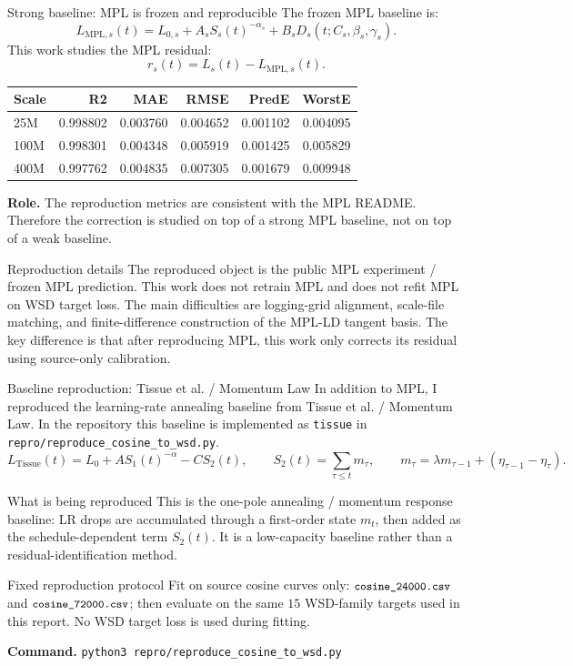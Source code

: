 \documentclass[9pt,aspectratio=169]{beamer}
\newcommand{\code}[1]{\texttt{\small #1}}
\begin{document}
\begin{frame}{Strong baseline: MPL is frozen and reproducible}
\small
The frozen MPL baseline is:
\[
L_{\mathrm{MPL},s}(t)
=
L_{0,s}
+
A_s S_s(t)^{-\alpha_s}
+
B_s D_s(t;C_s,\beta_s,\gamma_s).
\]
This work studies the MPL residual:
\[
r_s(t)=L_s(t)-L_{\mathrm{MPL},s}(t).
\]
\vfill
\begin{center}\scriptsize
\begin{tabular}{lrrrrr}
\toprule
Scale & R2 & MAE & RMSE & PredE & WorstE\\
\midrule
25M  & 0.998802 & 0.003760 & 0.004652 & 0.001102 & 0.004095\\
100M & 0.998301 & 0.004348 & 0.005919 & 0.001425 & 0.005829\\
400M & 0.997762 & 0.004835 & 0.007305 & 0.001679 & 0.009948\\
\bottomrule
\end{tabular}
\end{center}
\vfill
\textbf{Role.}
The reproduction metrics are consistent with the MPL README.
Therefore the correction is studied on top of a strong MPL baseline,
not on top of a weak baseline.
\vfill
\begin{block}{Reproduction details}
\footnotesize
The reproduced object is the public MPL experiment / frozen MPL prediction.
This work does not retrain MPL and does not refit MPL on WSD target loss.
The main difficulties are logging-grid alignment, scale-file matching,
and finite-difference construction of the MPL-LD tangent basis.
The key difference is that after reproducing MPL, this work only corrects its residual
using source-only calibration.
\end{block}
\end{frame}

\begin{frame}{Baseline reproduction: Tissue et al. / Momentum Law}
\small
In addition to MPL, I reproduced the learning-rate annealing baseline from
Tissue et al. / Momentum Law. In the repository this baseline is implemented
as \code{tissue} in \code{repro/reproduce\_cosine\_to\_wsd.py}.
\[
L_{\mathrm{Tissue}}(t)
=
L_0 + A S_1(t)^{-\alpha} - C S_2(t),
\qquad
S_2(t)=\sum_{\tau\le t} m_\tau,
\qquad
m_\tau=\lambda m_{\tau-1}+(\eta_{\tau-1}-\eta_\tau).
\]
\vspace{-0.4em}
\begin{block}{What is being reproduced}
\footnotesize
This is the one-pole annealing / momentum response baseline: LR drops are accumulated
through a first-order state \(m_t\), then added as the schedule-dependent term \(S_2(t)\).
It is a low-capacity baseline rather than a residual-identification method.
\end{block}
\vspace{-0.2em}
\begin{block}{Fixed reproduction protocol}
\footnotesize
Fit on source cosine curves only:
\(\code{cosine\_24000.csv}\) and \(\code{cosine\_72000.csv}\);
then evaluate on the same \(15\) WSD-family targets used in this report.
No WSD target loss is used during fitting.
\end{block}
\vfill
\footnotesize
\textbf{Command.}
\code{python3 repro/reproduce\_cosine\_to\_wsd.py}
\end{frame}
\end{document}
